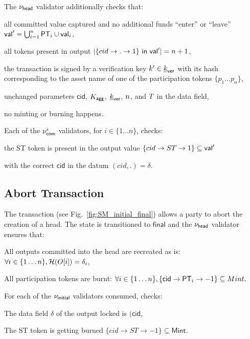 The $\nu_\mathsf{head}$ validator additionally checks that:
\begin{menumerate}
  \item all committed value captured and no additional funds ``enter'' or ``leave''
  $\mathsf{val}' = \bigcup_{i=1}^{n} \mathsf{PT}_{i} \cup \mathsf{val}_{i}$,
  \item all tokens present in output
  $|\{cid \rightarrow . \rightarrow 1\} ~ \mathsf{in} ~ \mathsf{val}'| = n + 1$,
  \item the transaction is signed by a verification key $k' \in \underline{k}_{\mathsf{ver}}$ with its
  hash corresponding to the asset name of one of the participation tokens
  $\{p_1 \dots p_n\}$,
  \item unchanged parameters $\mathsf{cid}$, $K_{\mathsf{agg}}$, $\underline{k}_{\mathsf{ver}}$, $n$, and
  $T$ in the data field,
  \item no minting or burning happens.
\end{menumerate}

\noindent Each of the $\nu_\mathsf{com}^i$ validators, for $i \in \{ 1\dots n\}$, checks:
\begin{menumerate}
    \item the ST token is present in the output value $\{cid \rightarrow ST \rightarrow 1\} \subseteq \mathsf{val}'$
    \item with the correct $\mathsf{cid}$ in the datum $(cid,.) = \delta$.
\end{menumerate}

\subsection{Abort Transaction}\label{sec:abort-tx} 



The \mtxAbort{} transaction
(see Fig.~\ref{fig:SM_initial_final}) allows a party to abort the
creation of a head.  The state is transitioned to $\mathsf{final}$ and the $\nu_\mathsf{head}$ validator ensures that:
\begin{menumerate}
 \item All outputs committed into the head are recreated as is: $\forall i \in \{1\dots n\}, \mathcal{H}(O[i]) = \delta_i$,
 \item All participation tokens are burnt: $\forall i \in \{1\dots n\}, \{\mathsf{cid} \rightarrow \mathsf{PT}_i \rightarrow -1\} \subseteq Mint.$
\end{menumerate} 

\noindent For each of the $\nu_\mathsf{initial}$ validators consumed, checks:
\begin{menumerate}
  \item The data field $\delta$ of the output locked is $(\mathsf{cid}$,
  \item The ST token is getting burned $\{cid \rightarrow ST \rightarrow -1\} \subseteq \mathsf{Mint}.$ 
\end{menumerate}

